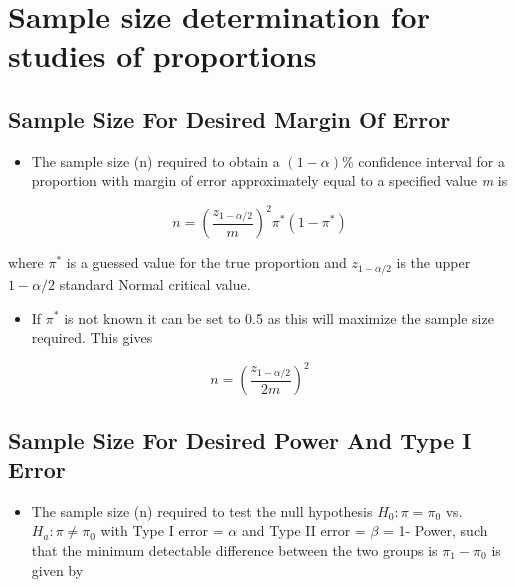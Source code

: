 \documentclass[
]{book}
\providecommand{\tightlist}{%
  \setlength{\itemsep}{0pt}\setlength{\parskip}{0pt}}
\begin{document}
\hypertarget{sample-size-determination-for-studies-of-proportions}{%
\section{Sample size determination for studies of proportions}\label{sample-size-determination-for-studies-of-proportions}}

\hypertarget{sample-size-for-desired-margin-of-error}{%
\subsection{Sample Size For Desired Margin Of Error}\label{sample-size-for-desired-margin-of-error}}

\begin{itemize}
\tightlist
\item
  The sample size (n) required to obtain a \((1-\alpha)\)\% confidence interval for a proportion with margin of error approximately equal to a specified value \emph{m} is
\end{itemize}

\[n=\left(\frac{z_{1-\alpha/2}}{m}\right)^2\pi^*(1-\pi^*)\]

where \(\pi^*\) is a guessed value for the true proportion and \(z_{1-\alpha/2}\) is the upper \(1-\alpha/2\) standard Normal critical value.

\begin{itemize}
\tightlist
\item
  If \(\pi^*\) is not known it can be set to 0.5 as this will maximize the sample size required. This gives
\end{itemize}

\[n=\left(\frac{z_{1-\alpha/2}}{2m}\right)^2\]

\hypertarget{sample-size-for-desired-power-and-type-i-error}{%
\subsection{Sample Size For Desired Power And Type I Error}\label{sample-size-for-desired-power-and-type-i-error}}

\begin{itemize}
\tightlist
\item
  The sample size (n) required to test the null hypothesis \(H_0:\pi=\pi_0\) vs.\\
  \(H_a:\pi\neq\pi_0\) with Type I error = \(\alpha\) and Type II error = \(\beta\) = 1- Power, such that the minimum detectable difference between the two groups is \(\pi_1-\pi_0\) is given by
\end{itemize}
\end{document}
